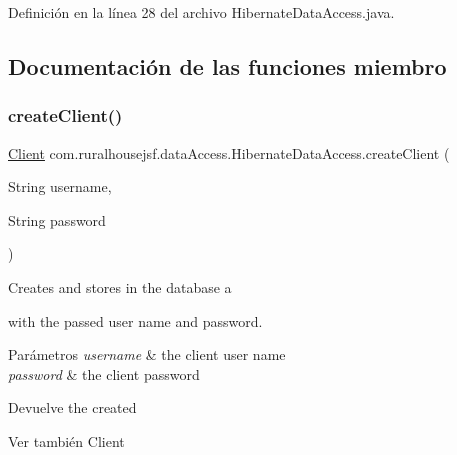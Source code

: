 Definición en la línea 28 del archivo Hibernate\+Data\+Access.\+java.



\subsection{Documentación de las funciones miembro}
\mbox{\label{classcom_1_1ruralhousejsf_1_1data_access_1_1_hibernate_data_access_ab1113c4a35f6f888d6bee15f25b117d5}} 
\subsubsection{\texorpdfstring{createClient()}{createClient()}}
{\footnotesize\ttfamily \mbox{\hyperlink{classcom_1_1ruralhousejsf_1_1domain_1_1_client}{Client}} com.\+ruralhousejsf.\+data\+Access.\+Hibernate\+Data\+Access.\+create\+Client (\begin{DoxyParamCaption}\item[{String}]{username,  }\item[{String}]{password }\end{DoxyParamCaption})}

Creates and stores in the database a
\begin{DoxyCode}{0}
\end{DoxyCode}
 with the passed user name and password.


\begin{DoxyParams}{Parámetros}
{\em username} & the client user name \\
\hline
{\em password} & the client password\\
\hline
\end{DoxyParams}
\begin{DoxyReturn}{Devuelve}
the created
\begin{DoxyCode}{0}
\end{DoxyCode}

\end{DoxyReturn}
\begin{DoxySeeAlso}{Ver también}
Client 
\end{DoxySeeAlso}


